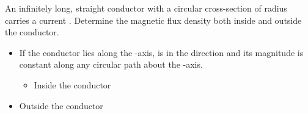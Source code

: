 
\begin{ELexample}{}

An infinitely long, straight conductor with a circular cross-section of radius  carries a current . Determine the magnetic flux density both inside and outside the conductor.


\begin{ELsolution}

\begin{itemize}
\tightlist
\item
  If the conductor lies along the -axis,  is in the \ELim{\phi} direction and its magnitude is constant along any circular path about the -axis.

  \begin{itemize}
  \tightlist
  \item
    Inside the conductor
  \end{itemize}
\end{itemize}


\begin{itemize}
\tightlist
\item
  Outside the conductor
\end{itemize}


\end{ELsolution}

\end{ELexample}



